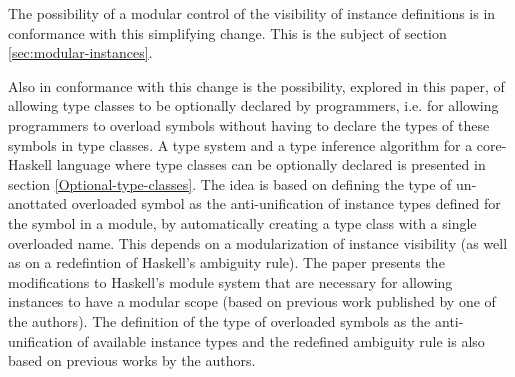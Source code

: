 The possibility of a modular control of the visibility of instance
definitions is in conformance with this simplifying change. This is
the subject of section \ref{sec:modular-instances}.

Also in conformance with this change is the possibility, explored in
this paper, of allowing type classes to be optionally declared by
programmers, i.e. for allowing programmers to overload symbols without
having to declare the types of these symbols in type classes. A type
system and a type inference algorithm for a core-Haskell language
where type classes can be optionally declared is presented in section
\ref{Optional-type-classes}.  The idea is based on defining the type
of un-anottated overloaded symbol as the anti-unification of instance
types defined for the symbol in a module, by automatically creating a
type class with a single overloaded name. This depends on a
modularization of instance visibility (as well as on a redefintion of
Haskell's ambiguity rule).  The paper presents the modifications to
Haskell's module system that are necessary for allowing instances to
have a modular scope (based on previous work published by one of the
authors). The definition of the type of overloaded symbols as the
anti-unification of available instance types and the redefined
ambiguity rule is also based on previous works by the authors.




